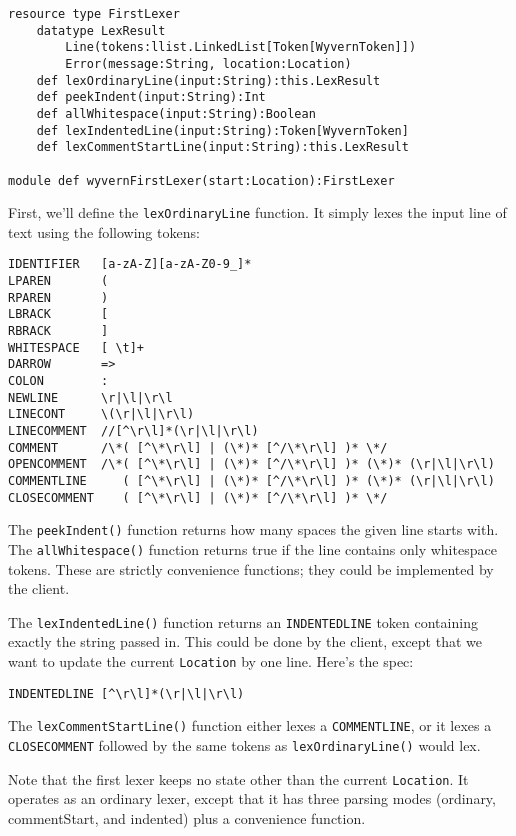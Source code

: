\documentclass[11pt]{article}
\begin{document}
\begin{sloppypar}
\begin{lstlisting}
resource type FirstLexer
    datatype LexResult
        Line(tokens:llist.LinkedList[Token[WyvernToken]])
        Error(message:String, location:Location)
    def lexOrdinaryLine(input:String):this.LexResult
    def peekIndent(input:String):Int
    def allWhitespace(input:String):Boolean
    def lexIndentedLine(input:String):Token[WyvernToken]
    def lexCommentStartLine(input:String):this.LexResult

module def wyvernFirstLexer(start:Location):FirstLexer
\end{lstlisting}

First, we'll define the \texttt{lexOrdinaryLine} function.  It simply lexes the input line of text using the following tokens:

\begin{verbatim}
IDENTIFIER   [a-zA-Z][a-zA-Z0-9_]*
LPAREN       (   
RPAREN       )
LBRACK       [  
RBRACK       ]
WHITESPACE   [ \t]+
DARROW       =>
COLON        :
NEWLINE      \r|\l|\r\l
LINECONT     \(\r|\l|\r\l)
LINECOMMENT  //[^\r\l]*(\r|\l|\r\l)
COMMENT      /\*( [^\*\r\l] | (\*)* [^/\*\r\l] )* \*/
OPENCOMMENT  /\*( [^\*\r\l] | (\*)* [^/\*\r\l] )* (\*)* (\r|\l|\r\l)
COMMENTLINE     ( [^\*\r\l] | (\*)* [^/\*\r\l] )* (\*)* (\r|\l|\r\l)
CLOSECOMMENT    ( [^\*\r\l] | (\*)* [^/\*\r\l] )* \*/
\end{verbatim}

The \texttt{peekIndent()} function returns how many spaces the given line starts with.  The \texttt{allWhitespace()} function returns true if the line contains only whitespace tokens.  These are strictly convenience functions; they could be implemented by the client.

The \texttt{lexIndentedLine()} function returns an \texttt{INDENTEDLINE} token containing exactly the string passed in.  This could be done by the client, except that we want to update the current \texttt{Location} by one line.  Here's the spec:

\begin{verbatim}
INDENTEDLINE [^\r\l]*(\r|\l|\r\l)
\end{verbatim}

The \texttt{lexCommentStartLine()} function either lexes a \texttt{COMMENTLINE}, or it lexes a \texttt{CLOSECOMMENT} followed by the same tokens as \texttt{lexOrdinaryLine()} would lex.

Note that the first lexer keeps no state other than the current \texttt{Location}.  It operates as an ordinary lexer, except that it has three parsing modes (ordinary, commentStart, and indented) plus a convenience function.



\end{sloppypar}
\end{document}
